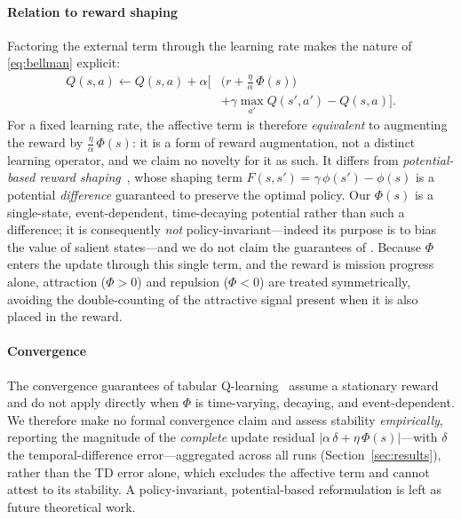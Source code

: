 \paragraph*{Relation to reward shaping} Factoring the external term through the
learning rate makes the nature of \eqref{eq:bellman} explicit:
\begin{equation}
\label{eq:shaping}
\begin{split}
Q(s,a) \leftarrow Q(s,a) + \alpha\Big[&\big(r + \tfrac{\eta}{\alpha}\,\Phi(s)\big)\\
&+ \gamma \max_{a'} Q(s',a') - Q(s,a)\Big].
\end{split}
\end{equation}
For a fixed learning rate, the affective term is therefore \emph{equivalent} to
augmenting the reward by $\tfrac{\eta}{\alpha}\,\Phi(s)$: it is a form of reward
augmentation, not a distinct learning operator, and we claim no novelty for it
as such. It differs from \emph{potential-based reward shaping}~\cite{ng1999},
whose shaping term $F(s,s')=\gamma\,\phi(s')-\phi(s)$ is a potential
\emph{difference} guaranteed to preserve the optimal policy. Our $\Phi(s)$ is a
single-state, event-dependent, time-decaying potential rather than such a
difference; it is consequently \emph{not} policy-invariant---indeed its purpose
is to bias the value of salient states---and we do not claim the guarantees of
\cite{ng1999}. Because $\Phi$ enters the update through this single term, and
the reward is mission progress alone, attraction ($\Phi>0$) and repulsion
($\Phi<0$) are treated symmetrically, avoiding the double-counting of the
attractive signal present when it is also placed in the reward.

\paragraph*{Convergence} The convergence guarantees of tabular
Q-learning~\cite{suttonbarto2018} assume a stationary reward and do not apply
directly when $\Phi$ is time-varying, decaying, and event-dependent. We
therefore make no formal convergence claim and assess stability
\emph{empirically}, reporting the magnitude of the \emph{complete} update
residual $|\alpha\,\delta + \eta\,\Phi(s)|$---with $\delta$ the temporal-difference
error---aggregated across all runs (Section~\ref{sec:results}), rather than the
TD error alone, which excludes the affective term and cannot attest to its
stability. A policy-invariant, potential-based reformulation is left as future
theoretical work.

